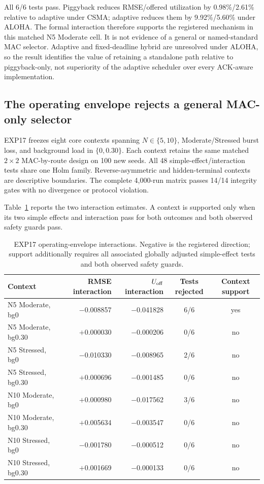 All 6/6 tests pass. Piggyback reduces RMSE/offered utilization by
0.98\%/2.61\% relative to adaptive under CSMA; adaptive reduces them by
9.92\%/5.60\% under ALOHA. The formal interaction therefore supports the
registered mechanism in this matched N5 Moderate cell. It is not evidence of
a general or named-standard MAC selector. Adaptive and fixed-deadline hybrid
are unresolved under ALOHA, so the result identifies the value of retaining a
standalone path relative to piggyback-only, not superiority of the adaptive
scheduler over every ACK-aware implementation.

\subsection{The operating envelope rejects a general MAC-only selector}

EXP17 freezes eight core contexts spanning $N\in\{5,10\}$,
Moderate/Stressed burst loss, and background load in $\{0,0.30\}$. Each context
retains the same matched $2\times2$ MAC-by-route design on 100 new seeds. All
48 simple-effect/interaction tests share one Holm family. Reverse-asymmetric
and hidden-terminal contexts are descriptive boundaries. The complete
4,000-run matrix passes 14/14 integrity gates with no divergence or protocol
violation.

Table~\ref{tab:s2-exp17} reports the two interaction estimates. A context is
supported only when its two simple effects and interaction pass for both
outcomes and both observed safety guards pass.

\begin{table}[t]
\centering
\caption{EXP17 operating-envelope interactions. Negative is the registered
direction; support additionally requires all associated globally adjusted
simple-effect tests and both observed safety guards.}
\label{tab:s2-exp17}
\scriptsize
\begin{tabular}{lrrcc}
\toprule
Context & RMSE interaction & $U_{\rm off}$ interaction & Tests rejected & Context support \\
\midrule
N5 Moderate, bg0    & $-$0.008857 & $-$0.041828 & 6/6 & yes \\
N5 Moderate, bg0.30 & $+$0.000030 & $-$0.000206 & 0/6 & no \\
N5 Stressed, bg0    & $-$0.010330 & $-$0.008965 & 2/6 & no \\
N5 Stressed, bg0.30 & $+$0.000696 & $-$0.001485 & 0/6 & no \\
N10 Moderate, bg0   & $+$0.000980 & $-$0.017562 & 3/6 & no \\
N10 Moderate, bg0.30& $+$0.005634 & $-$0.003547 & 0/6 & no \\
N10 Stressed, bg0   & $-$0.001780 & $-$0.000512 & 0/6 & no \\
N10 Stressed, bg0.30& $+$0.001669 & $-$0.000133 & 0/6 & no \\
\bottomrule
\end{tabular}
\end{table}

